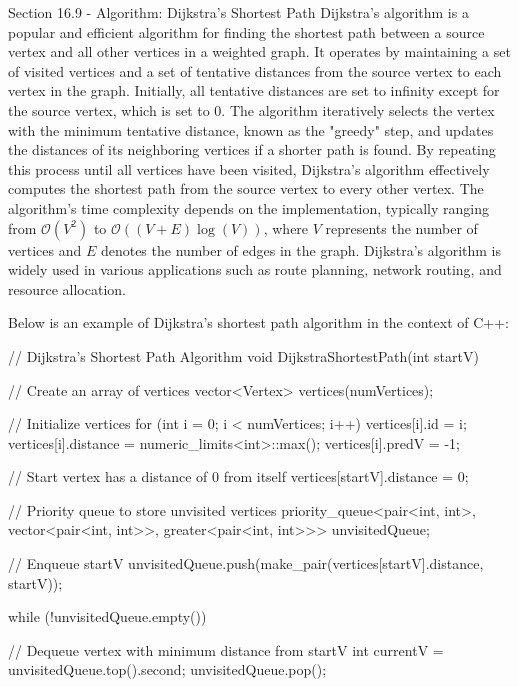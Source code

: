 \begin{notes}{Section 16.9 - Algorithm: Dijkstra's Shortest Path}
    Dijkstra's algorithm is a popular and efficient algorithm for finding the shortest path between a source vertex and all other vertices in a weighted graph. It operates by maintaining a set of visited vertices and a set 
    of tentative distances from the source vertex to each vertex in the graph. Initially, all tentative distances are set to infinity except for the source vertex, which is set to 0. The algorithm iteratively selects the vertex 
    with the minimum tentative distance, known as the "greedy" step, and updates the distances of its neighboring vertices if a shorter path is found. By repeating this process until all vertices have been visited, Dijkstra's 
    algorithm effectively computes the shortest path from the source vertex to every other vertex. The algorithm's time complexity depends on the implementation, typically ranging from $\mathcal{O}(V^2)$ to $\mathcal{O}((V+E)\log{(V)})$, 
    where $V$ represents the number of vertices and $E$ denotes the number of edges in the graph. Dijkstra's algorithm is widely used in various applications such as route planning, network routing, and resource allocation.
    
    \begin{highlight}
        Below is an example of Dijkstra's shortest path algorithm in the context of C++:
    
    \begin{code}[C++]
    // Dijkstra's Shortest Path Algorithm
    void DijkstraShortestPath(int startV) {
        // Create an array of vertices
        vector<Vertex> vertices(numVertices);
    
        // Initialize vertices
        for (int i = 0; i < numVertices; i++) {
            vertices[i].id = i;
            vertices[i].distance = numeric_limits<int>::max();
            vertices[i].predV = -1;
        }
    
        // Start vertex has a distance of 0 from itself
        vertices[startV].distance = 0;
    
        // Priority queue to store unvisited vertices
        priority_queue<pair<int, int>, vector<pair<int, int>>, 
            greater<pair<int, int>>> unvisitedQueue;
    
        // Enqueue startV
        unvisitedQueue.push(make_pair(vertices[startV].distance, startV));
    
        while (!unvisitedQueue.empty()) {
            // Dequeue vertex with minimum distance from startV
            int currentV = unvisitedQueue.top().second;
            unvisitedQueue.pop();
    
}}
\end{code}
\end{highlight}
\end{notes}
